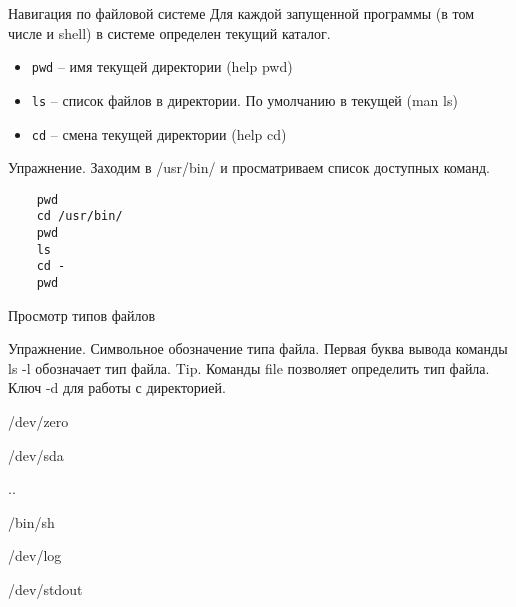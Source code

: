 \begin{frame}[fragile]{Навигация по файловой системе}
 Для каждой запущенной программы (в том числе и shell) в системе определен \alert{текущий каталог}. 
      \begin{itemize}
		  \item {\tt pwd} -- имя текущей директории (help pwd)
		  \item {\tt ls} -- список файлов в директории. По умолчанию в текущей (man ls)
		  \item {\tt cd} -- смена текущей директории (help cd)
      \end{itemize}
      \begin{block}{Упражнение. Заходим в /usr/bin/ и просматриваем список доступных команд.}
	\begin{lstlisting}
	pwd
	cd /usr/bin/
	pwd
	ls
	cd -	
	pwd
	\end{lstlisting}
      \end{block}
\end{frame}

\begin{frame}[fragile]{Просмотр типов файлов}
      \begin{block}{Упражнение. Символьное обозначение типа файла.}
Первая буква вывода команды ls -l обозначает тип файла. 
Tip. Команды file позволяет определить тип файла. Ключ -d для работы с
директорией. 

/dev/zero

/dev/sda 

.. 

/bin/sh 

/dev/log

/dev/stdout
      \end{block}
\end{frame}

